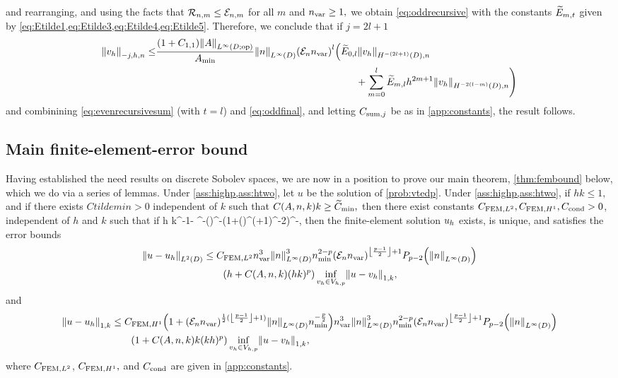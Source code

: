 and rearranging, and using the facts that $\mathcal R_{n,m} \leq \mathcal E_{n,m}$ for all $m$ and $n_{\mathrm{var}} \geq 1,$ we obtain \cref{eq:oddrecursive} with the constants $\widetilde{E}_{m,t}$ given by \cref{eq:Etilde1,eq:Etilde3,eq:Etilde4,eq:Etilde5}. Therefore, we conclude that if $j = 2l+1$
\begin{align}
\Nfn{-j,h,n}{\vh} \leq& \frac{\mleft(1+\Cfn{1,1}\mright)\NLiDop{A}}{\Amin}\NLiD{n}\mleft(\En \nvar\mright)^{l}\mleft(\Etildefn{0,l} \NHnfn{-(2l+1)}{D}{\vh}\mright.\nonumber\\
&\mleft.\hphantom{\frac{\mleft(1+\Cfn{1,1}\mright)\NLiDop{A}}{\Amin}\NLiD{n}\mleft(\En \nvar\mright)^{l}}
\quad\quad+ \sum_{m=0}^{l} \Etildefn{m,l} h^{2m+1}  \NHnfn{-2(l-m)}{D}{\vh}\mright)\label{eq:oddfinal}
\end{align}
and combinining \cref{eq:evenrecursivesum} (with $t=l$) and \cref{eq:oddfinal}, and letting $C_{\mathrm{sum},j}$ be as in \cref{app:constants}, the result follows.%
\epf

\subsection{Main finite-element-error bound}\label{sec:fembound}

Having established the need results on discrete Sobolev spaces, we are now in a position to prove our main theorem, \cref{thm:fembound} below, which we do via a series of lemmas.
\label{thm:fembound}
Under \cref{ass:highp,ass:htwo}, let $u$ be the solution of \cref{prob:vtedp}. Under \cref{ass:highp,ass:htwo}, if $hk \leq 1,$ and if there exists $Ctildemin > 0$ independent of $k$ such that $\CAnk k \geq \Ctildemin,$ then there exist constants $C_{\mathrm{FEM},L^{2}}, C_{\mathrm{FEM},H^{1}}, C_{\mathrm{cond}} > 0$, independent of $h$ and $k$ such that if
\beq\label{eq:hfemcond}
h \leq \Chcond k^{-1-} \CAnk^{-}\mleft(\mright)^{-}\mleft(1+\mleft(\En\nvar\mright)^{\half(+1)}\nmin^{-2}\mright)^{-},
\eeq
then the finite-element solution $u_{h}$ exists, is unique, and satisfies the error bounds
\begin{align}
\NLtD{u-\uh} &\leq \CFEMLt \nvar^3\NLiD{n}^3\nmin^{2-p} \mleft(\En \nvar\mright)^{\floor{\frac{p-1}2}+1}\Pfn{p-2}\mleft(\NLiD{n}\mright)\nonumber\\
&\quad\quad\mleft(h +  \CAnk (hk)^{p}\mright)\inf_{\vh \in \Vhp} \NW{u-\vh},\label{eq:femltbound}
\end{align}
and
\begin{align}
\NW{u-\uh} &\leq \CFEMHo \mleft(1+\mleft(\En\nvar\mright)^{\half(\floor{\frac{p-1}2}+1)}\NLiD{n}\nmin^{-\frac{p}2}\mright)\nvar^3\NLiD{n}^3\nmin^{2-p} \mleft(\En \nvar\mright)^{\floor{\frac{p-1}2}+1}\Pfn{p-2}\mleft(\NLiD{n}\mright)\nonumber\\
&\quad\quad\mleft(1 + \CAnk k(kh)^p\mright) \inf_{\vh \in \Vhp} \NW{u-\vh},\label{eq:femhobound}
\end{align}
where $C_{\mathrm{FEM},L^{2}}$, $C_{\mathrm{FEM},H^{1}},$ and $C_{\mathrm{cond}}$ are given in \cref{app:constants}.
\enth

